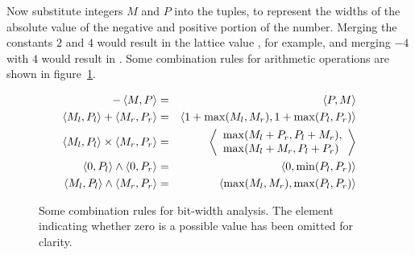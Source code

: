 \documentclass[preprint]{acmconf}
\begin{document}
Now substitute integers $M$ and $P$ into the tuples, to represent the
widths of the absolute value of the negative and positive portion of
the number.  Merging the constants $2$ and $4$ would result in the lattice
value , for example, and merging $-4$ with $4$ would result in
.  Some combination rules for arithmetic operations are
shown in figure~\ref{fig:bitrules}.
\begin{figure}
\begin{eqnarray*}
-\left\langle M,P \right\rangle &=& \left\langle P,M \right\rangle\\
\left\langle M_l,P_l \right\rangle + \left\langle M_r,P_r \right\rangle &=& \left\langle 1+\max(M_l,M_r),1+\max(P_l,P_r) \right\rangle\\
\left\langle M_l,P_l \right\rangle \times \left\langle M_r,P_r \right\rangle &=&
\left\langle \begin{array}{l}\max(M_l+P_r,P_l+M_r),\\
                       \max(M_l+M_r,P_l+P_r)\end{array} \right\rangle\\
\left\langle 0,P_l \right\rangle \wedge \left\langle 0,P_r \right\rangle &=& \left\langle 0,\min(P_l,P_r) \right\rangle\\
\left\langle M_l,P_l \right\rangle\wedge \left\langle M_r,P_r \right\rangle &=& \left\langle \max(M_l,M_r),\max(P_l,P_r) \right\rangle
\end{eqnarray*}%
\caption{Some combination rules for bit-width analysis.  The 
  element indicating whether zero is a possible value has been omitted
  for clarity.}\label{fig:bitrules}
\end{figure}
\end{document}
